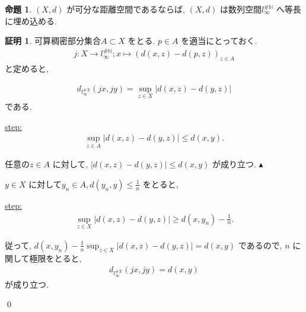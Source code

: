 \documentclass[10pt, fleqn, label-section=none]{bxjsarticle}
\theoremstyle{definition}
\newtheorem{prop}[dfn]{命題}
\newtheorem*{pf*}{証明}
\newcommand{\abs}[1]{\left|#1\right|}
\renewcommand{\;}{\, ; \,}
\newenvironment{claim}[1]{\par\noindent\underline{step:}\space#1}{}
\newenvironment{claimproof}[1]{\par\noindent{($\because$)}\space#1}{\hfill $\blacktriangle $}
\begin{document}
\begin{prop}$(X, d)$ が可分な距離空間であるならば, $(X, d)$ は数列空間$l_{\infty}^{\# \mathbb N}$ へ等長に埋め込める.  

\end{prop}
\begin{pf*}可算稠密部分集合$A \subset X$ をとる. $p \in A$ を適当にとっておく. 
\begin{align*} j: X \rightarrow l _{\infty}^{\# \mathbb N}   ; x \mapsto (d(x, z) - d(p, z))_{z \in A} \end{align*}
と定めると, 

\begin{align*} d_{l _{\infty}^{\# X}}(jx, jy) = \sup_{z \in X} \abs{d(x, z) - d(y, z)}  \end{align*} 
である. 
\begin{claim}
\begin{align*} \sup_{z \in A} \abs{d(x, z) - d(y, z)}  \leq d(x, y) . \end{align*}
\end{claim}
\begin{claimproof}
任意の$z \in A$ に対して, $\abs{d(x, z) - d(y, z)} \leq d(x, y)$ が成り立つ. 
\end{claimproof}

$y \in X$ に対して$y_n \in A , d(y_n, y) \leq \frac{1}{n}$ をとると, 

\begin{claim}
\begin{align*} \sup_{z \in X} \abs{d(x, z) - d(y, z)}  \geq d(x, y_n) - \frac{1}{n} . \end{align*}
\end{claim}

従って, $d(x, y_n) - \frac{1}{n}  \sup_{z \in X} \abs{d(x, z) - d(y, z)}  = d(x, y)$ であるので, $n$ に関して極限をとると, 
\begin{align*} d_{l _{\infty}^{\# X}}(jx, jy) = d(x, y)  \end{align*}
が成り立つ. 


\qed
\end{pf*}
\end{document}
